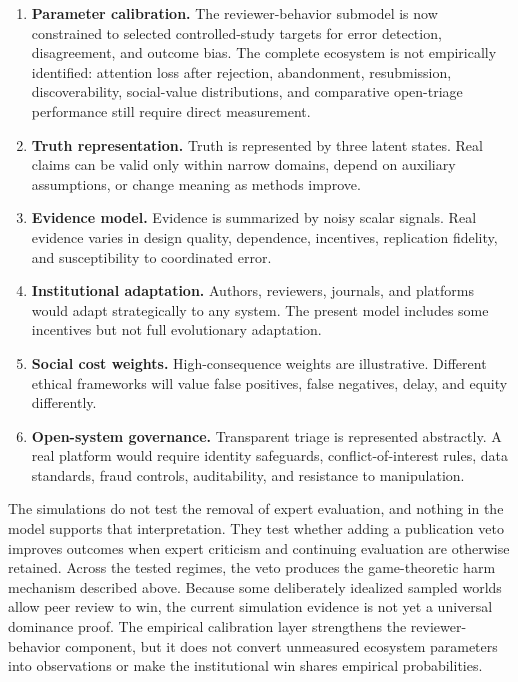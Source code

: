 \documentclass[11pt]{article}
\begin{document}
\begin{enumerate}
    \item \textbf{Parameter calibration.} The reviewer-behavior submodel is now constrained to selected controlled-study targets for error detection, disagreement, and outcome bias. The complete ecosystem is not empirically identified: attention loss after rejection, abandonment, resubmission, discoverability, social-value distributions, and comparative open-triage performance still require direct measurement.
    \item \textbf{Truth representation.} Truth is represented by three latent states. Real claims can be valid only within narrow domains, depend on auxiliary assumptions, or change meaning as methods improve.
    \item \textbf{Evidence model.} Evidence is summarized by noisy scalar signals. Real evidence varies in design quality, dependence, incentives, replication fidelity, and susceptibility to coordinated error.
    \item \textbf{Institutional adaptation.} Authors, reviewers, journals, and platforms would adapt strategically to any system. The present model includes some incentives but not full evolutionary adaptation.
    \item \textbf{Social cost weights.} High-consequence weights are illustrative. Different ethical frameworks will value false positives, false negatives, delay, and equity differently.
    \item \textbf{Open-system governance.} Transparent triage is represented abstractly. A real platform would require identity safeguards, conflict-of-interest rules, data standards, fraud controls, auditability, and resistance to manipulation.
\end{enumerate}

The simulations do not test the removal of expert evaluation, and nothing in the model supports that interpretation. They test whether adding a publication veto improves outcomes when expert criticism and continuing evaluation are otherwise retained. Across the tested regimes, the veto produces the game-theoretic harm mechanism described above. Because some deliberately idealized sampled worlds allow peer review to win, the current simulation evidence is not yet a universal dominance proof. The empirical calibration layer strengthens the reviewer-behavior component, but it does not convert unmeasured ecosystem parameters into observations or make the institutional win shares empirical probabilities.
\end{document}
